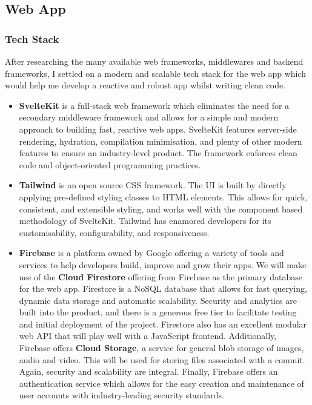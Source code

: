\documentclass[12pt,a4paper]{article}
\begin{document}
\subsection{Web App}

\subsubsection{Tech Stack}
After researching the many available web frameworks, middlewares and backend frameworks, I settled on a modern and scalable tech stack for the web app which would help me develop a reactive and robust app whilst writing clean code.
\begin{itemize}
    \item \textbf{SvelteKit} is a full-stack web framework which eliminates the need for a secondary middleware framework and allows for a simple and modern approach to building fast, reactive web apps. SvelteKit features server-side rendering, hydration, compilation minimisation, and plenty of other modern features to ensure an industry-level product. The framework enforces clean code and object-oriented programming practices. 
    \item \textbf{Tailwind} is an open source CSS framework. The UI is built by directly applying pre-defined styling classes to HTML elements. This allows for quick, consistent, and extensible styling, and works well with the component based methodology of SvelteKit. Tailwind has enamored developers for its customisability, configurability, and responsiveness.
    \item \textbf{Firebase} is a platform owned by Google offering a variety of tools and services to help developers build, improve and grow their apps. We will make use of the \textbf{Cloud Firestore} offering from Firebase as the primary database for the web app. Firestore is a NoSQL database that allows for fast querying, dynamic data storage and automatic scalability. Security and analytics are built into the product, and there is a generous free tier to facilitate testing and initial deployment of the project. Firestore also has an excellent modular web API that will play well with a JavaScript frontend. Additionally, Firebase offers \textbf{Cloud Storage}, a service for general blob storage of images, audio and video. This will be used for storing files associated with a commit. Again, security and scalability are integral. Finally, Firebase offers an authentication service which allows for the easy creation and maintenance of user accounts with industry-leading security standards.
\end{itemize}
\end{document}
